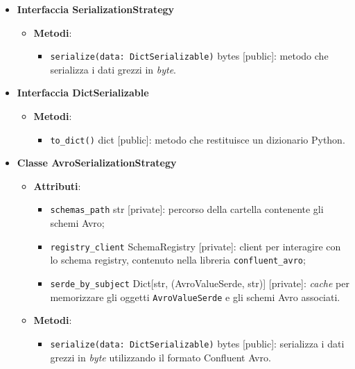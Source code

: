 \begin{itemize}
	\item \textbf{Interfaccia SerializationStrategy}
	      \begin{itemize}
		      \item \textbf{Metodi}:
		            \begin{itemize}
			            \item \texttt{serialize(data: DictSerializable)} bytes [public]: metodo che serializza i dati grezzi in \textit{byte}.
		            \end{itemize}
	      \end{itemize}
	\item \textbf{Interfaccia DictSerializable}
	      \begin{itemize}
		      \item \textbf{Metodi}:
		            \begin{itemize}
			            \item \texttt{to\_dict()} dict [public]: metodo che restituisce un dizionario Python.
		            \end{itemize}
	      \end{itemize}
	\item \textbf{Classe AvroSerializationStrategy}
	      \begin{itemize}
		      \item \textbf{Attributi}:
		            \begin{itemize}
			            \item \texttt{schemas\_path} str [private]: percorso della cartella contenente gli schemi Avro;
			            \item \texttt{registry\_client} SchemaRegistry [private]: client per interagire con lo schema registry, contenuto nella libreria \texttt{confluent\_avro};
			            \item \texttt{serde\_by\_subject} Dict[str, (AvroValueSerde, str)] [private]: \textit{cache} per memorizzare gli oggetti \texttt{AvroValueSerde} e gli schemi Avro associati.
		            \end{itemize}
		      \item \textbf{Metodi}:
		            \begin{itemize}
			            \item \texttt{serialize(data: DictSerializable)} bytes [public]: serializza i dati grezzi in \textit{byte} utilizzando il formato Confluent Avro.
		            \end{itemize}

\end{itemize}
\end{itemize}
